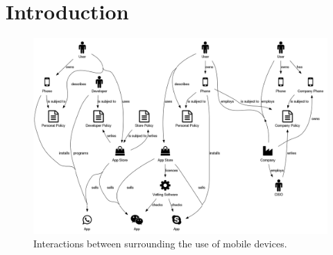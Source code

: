 \documentclass[thesis.tex]{subfiles}
\begin{document}
\chapter{Introduction}

%

\begin{figure}
  \centering
  \includegraphics[width=\linewidth]{figures/mobile-ecosystem.png}
  \caption{Interactions between surrounding the use of mobile devices.}
  \label{fig:mobile-ecosystem}
\end{figure}
\end{document}
